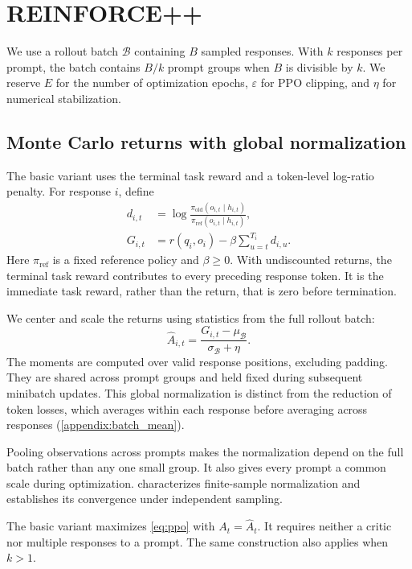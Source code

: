 \section{REINFORCE++}\label{sec:method}
We use a rollout batch $\mathcal B$ containing $B$ sampled responses. With $k$ responses per prompt, the batch contains $B/k$ prompt groups when $B$ is divisible by $k$. We reserve $E$ for the number of optimization epochs, $\varepsilon$ for PPO clipping, and $\eta$ for numerical stabilization.

\subsection{Monte Carlo returns with global normalization}
The basic variant uses the terminal task reward and a token-level log-ratio penalty. For response $i$, define
\begin{align}
 d_{i,t}&=\log\frac{\pi_{\mathrm{old}}(o_{i,t}\mid h_{i,t})}
 {\pi_{\mathrm{ref}}(o_{i,t}\mid h_{i,t})},\\
 G_{i,t}&=r(q_i,o_i)-\beta\sum_{u=t}^{T_i}d_{i,u}.
 \label{eq:return}
\end{align}
Here $\pi_{\mathrm{ref}}$ is a fixed reference policy and $\beta\geq0$. With undiscounted returns, the terminal task reward contributes to every preceding response token. It is the immediate task reward, rather than the return, that is zero before termination.

We center and scale the returns using statistics from the full rollout batch:
\begin{equation}
 \widehat A_{i,t}=\frac{G_{i,t}-\mu_{\mathcal B}}{\sigma_{\mathcal B}+\eta}.
 \label{eq:global}
\end{equation}
The moments are computed over valid response positions, excluding padding. They are shared across prompt groups and held fixed during subsequent minibatch updates. This global normalization is distinct from the reduction of token losses, which averages within each response before averaging across responses (\cref{appendix:batch_mean}).

Pooling observations across prompts makes the normalization depend on the full batch rather than any one small group. It also gives every prompt a common scale during optimization.  characterizes finite-sample normalization and establishes its convergence under independent sampling.

The basic variant maximizes \cref{eq:ppo} with $A_t=\widehat A_t$. It requires neither a critic nor multiple responses to a prompt. The same construction also applies when $k>1$.

